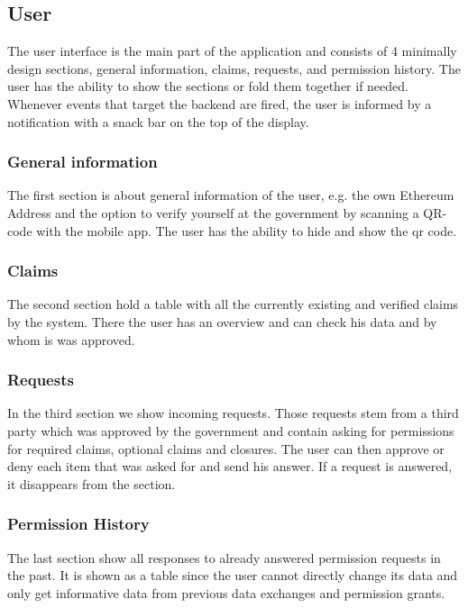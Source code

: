 \subsection{User}
\label{sec:user}

The user interface is the main part of the application and consists of 4 minimally design sections, general information,
claims, requests, and permission history. The user has the ability to show the sections or fold them together if needed.
Whenever events that target the backend are fired, the user is informed by a notification with a snack bar on the top of
the display.

\subsubsection{General information}

The first section is about general information of the user, e.g. the own Ethereum Address and the option to verify yourself
at the government by scanning a QR-code with the mobile app. The user has the ability to hide and show the qr code.

\subsubsection{Claims}

The second section hold a table with all the currently existing and verified claims by the system. There the user has an
overview and can check his data and by whom is was approved.

\subsubsection{Requests}

In the third section we show incoming requests. Those requests stem from a third party which was approved by the government
and contain asking for permissions for required claims, optional claims and closures. The user can then approve or deny
each item that was asked for and send his answer. If a request is answered, it disappears from the section.

\subsubsection{Permission History}

The last section show all responses to already answered permission requests in the past. It is shown as a table since the
user cannot directly change its data and only get informative data from previous data exchanges and permission grants.

